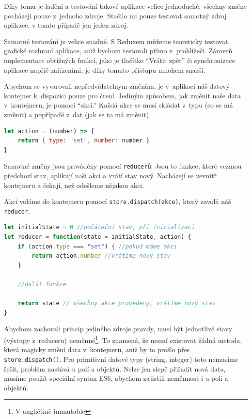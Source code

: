 \documentclass[a4paper,11pt,oneside]{article}
\begin{document}
Díky tomu je ladění a testování takové aplikace velice jednoduché, všechny změny pocházejí pouze z~jednoho zdroje. Stačilo mi pouze testovat samotný zdroj aplikace, v tomto případě jen jeden zdroj. 

\vspace*{\fill}
\pagebreak


Samotné testování je velice snadné. S Reduxem můžeme teoreticky testovat grafické rozhraní aplikace, aniž bychom testovali přímo v~prohlížeči. Zároveň implementace obtížných funkcí, jako je tlačítko \enquote{Vrátit zpět} či synchronizace aplikace napříč zařízeními, je díky tomuto přístupu mnohem snazší. 

Abychom se vyvarovali nepředvídatelným změnám, je v~aplikaci náš datový kontejner k~dispozici pouze pro čtení. Jediným způsobem, jak změnit naše data v~kontejneru, je pomocí \enquote{akcí.} Každá akce se musí skládat z~typu (co se má změnit) a popřípadě z~dat (jak se to má změnit). 

\begin{lstlisting}[language=javascript, caption={JavaScript}]
let action = (number) => {
	return { type: "set", number: number }
}
\end{lstlisting}

Samotné změny jsou prováděny pomocí \lstinline|reducerů|. Jsou to funkce, které vezmou předchozí stav, aplikují naši akci a vrátí stav nový. Nacházejí se vevnitř kontejneru a čekají, než odešleme nějakou akci.

Akci voláme do kontejneru pomocí \lstinline|store.dispatch(akce)|, který zavolá náš \lstinline|reducer|.

\begin{lstlisting}[language=javascript, caption={JavaScript}]
let initialState = 0 //počáteční stav, při inicializaci
let reducer = function(state = initialState, action) {
	if (action.type === "set") { //pokud máme akci 
		return action.number //vrátíme nový stav
	} 
	
	//další funkce
	
	return state // všechny akce provedeny, vrátíme nový stav
}
\end{lstlisting}

Abychom zachovali princip jediného zdroje pravdy, musí být jednotlivé stavy (výstupy z~reduceru) neměnné\footnote{V angličtině immutable}. To znamená, že nesmí existovat žádná metoda, která magicky změní data v~kontejneru, aniž by to prošlo přes \lstinline|store.dispatch()|. Pro primitivní datové typy (string, integer) toto nemusíme řešit, problém nastává u polí a objektů. Nelze jen slepě přiřadit nová data, musíme použít speciální syntax ES6, abychom zajistili neměnnost i u polí a objektů.
\end{document}
